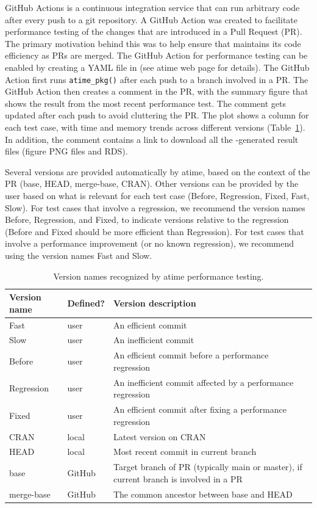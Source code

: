 GitHub Actions is a continuous integration service that can run arbitrary code after every push to a git repository.
A GitHub Action was created to facilitate performance testing of the changes that are introduced in a Pull Request (PR). 
The primary motivation behind this was to help ensure that  maintains its code efficiency as PRs are merged.
The GitHub Action for performance testing can be enabled by creating a YAML file in  (see atime web page for details).
The GitHub Action first runs \verb|atime_pkg()| after each push to a branch involved in a PR.
The GitHub Action then creates a comment in the PR, with the summary figure that shows the result from the most recent performance test.
The comment gets updated after each push to avoid cluttering the PR.
The plot shows a column for each test case, with time and memory trends across different  versions (Table~\ref{tab:version-labels}).
In addition, the comment contains a link to download all the -generated result files (figure PNG files and RDS).

Several versions are provided automatically by atime, based on the context of the PR (base, HEAD, merge-base, CRAN).
Other versions can be provided by the user based on what is relevant for each test case (Before, Regression, Fixed, Fast, Slow).
For test cases that involve a regression, we recommend the version names Before, Regression, and Fixed, to indicate versions relative to the regression (Before and Fixed should be more efficient than Regression).
For test cases that involve a performance improvement (or no known regression), we recommend using the version names Fast and Slow.
\begin{table}[t]
        \centering
            \caption{\label{tab:version-labels}Version names recognized by atime performance testing. }
        \begin{tabular}    
        {|m{2.2cm}|m{1.5cm}|m{9cm}|}
  \hline
      \textbf{Version name} & \textbf{Defined?} & \textbf{Version description} \\
  \hline
  Fast & user & An efficient commit \\
  \hline
  Slow & user & An inefficient commit\\
  \hline
  Before & user & An efficient commit before a performance regression  \\
  \hline
  Regression & user & An inefficient commit affected by a performance regression \\
  \hline  
   Fixed & user & An efficient commit after  fixing a performance regression \\
  \hline  
  CRAN & local & Latest version on CRAN  \\
  \hline
  HEAD & local &  Most recent commit in current branch \\
  \hline
  base & GitHub & Target branch of PR (typically main or master), if current branch is involved in a PR \\
  \hline
  merge-base & GitHub & The common ancestor between base and HEAD \\
  \hline
    \end{tabular}
\end{table}



